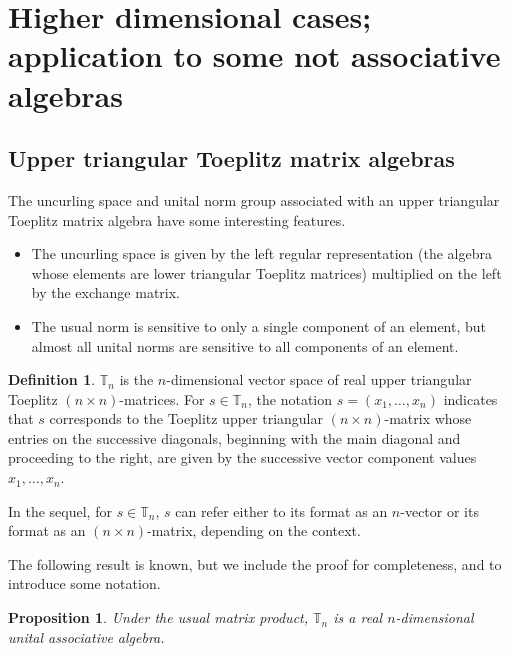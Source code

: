 \documentclass{amsart}
\numberwithin{equation}{section}
\newtheorem{proposition}[theorem]{Proposition}
\theoremstyle{definition}
\newtheorem{definition}[theorem]{Definition}
\numberwithin{theorem}{section}
\begin{document}
\section{Higher dimensional cases; application to some not associative algebras}
\subsection{Upper triangular Toeplitz matrix algebras}

The uncurling space and unital norm group associated with an upper triangular Toeplitz matrix algebra have some interesting features.
\begin{itemize}\item The uncurling space is given by the left regular representation (the algebra whose elements are lower triangular Toeplitz matrices) multiplied on the left by the exchange matrix. \item The usual norm is sensitive to only a single component of an element, but almost all unital norms are sensitive to all components of an element.\end{itemize}

\bigskip
 
 \begin{definition}\label{5/4/22.1} $\mathbb{T}_n$ is the $n$-dimensional vector space of real upper triangular Toeplitz $(n\times n)$-matrices. For $s\in \mathbb{T}_n$, the notation $s=(x_1,\dots,x_n)$ indicates that $s$ corresponds to the Toeplitz upper triangular $(n\times n)$-matrix whose entries on the successive diagonals, beginning with the main diagonal and proceeding to the right, are given by the successive vector component values $x_1,\dots,x_n$.   
\end{definition}

In the sequel, for $s\in \mathbb{T}_n$, $s$ can refer either to its format as an $n$-vector or its format as an $(n\times n)$-matrix, depending on the context.


The following result is known, but we include the proof for completeness, and to introduce some notation.  
 \begin{proposition}\label{5/10/22.1} Under the usual matrix product, $\mathbb{T}_n$ is a real $n$-dimensional unital associative algebra.\end{proposition} 
 
\end{document}
